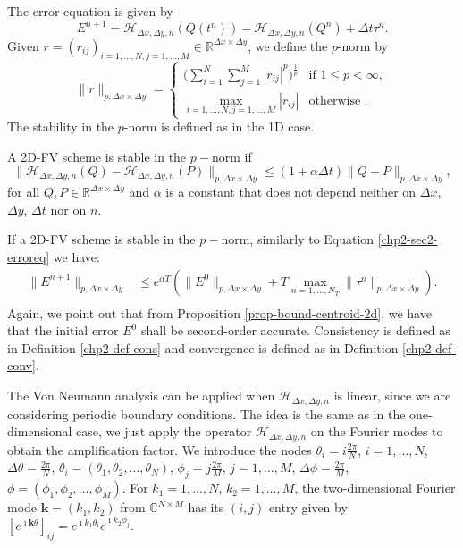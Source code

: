 The error equation is given by
\begin{equation}
	E^{n+1} = \mathcal{H}_{\Delta x ,\Delta y,n}(Q(t^n)) - \mathcal{H}_{\Delta x ,\Delta y,n}(Q^n) +  \Delta t \tau^n.
\end{equation}
Given $r = (r_{ij})_{i=1,\ldots,N,j=1,\ldots,M}\in \mathbb{R}^{\Delta x \times \Delta y}$, we define the $p$-norm by
\begin{equation}
	\label{chp3-pnorm}
	\|r\|_{p,\Delta x \times \Delta y}=
	\begin{cases}
		\bigg( \sum_{i=1}^{N} \sum_{j=1}^{M}|r_{ij}|^p \bigg)^{\frac{1}{p}} & \text{if } 1\leq p < \infty,\\
		\max_{i=1, \ldots, N,j=1,\ldots,M}{|r_{ij}|} & \text{otherwise }.
	\end{cases}
\end{equation}
The stability in the $p$-norm is defined as in the 1D case.
\begin{definition}
	A 2D-FV scheme is stable in the $p-$norm if 
	\begin{equation}
		\|\mathcal{H}_{\Delta x ,\Delta y,n}(Q) - \mathcal{H}_{\Delta x ,\Delta y,n}(P)\|_{p,\Delta x \times \Delta y} \leq (1+\alpha \Delta t)  \|Q-P\|_{p,\Delta x \times \Delta y},
	\end{equation}
	for all $Q, P \in \mathbb{R}^{\Delta x \times \Delta y}$ and $\alpha$ is a constant
	that does not depend neither on $\Delta x$, $\Delta y$, $\Delta t$ nor on $n$.
\end{definition}
If a 2D-FV scheme is stable in the $p-$norm, similarly to Equation \eqref{chp2-sec2-erroreq} we have:
\begin{align*}
		\|E^{n+1}\|_{p,\Delta x \times \Delta y} &\leq e^{\alpha T}(\|E^0\|_{p,\Delta x \times \Delta y} + T\max_{n=1, \ldots, N_T}\|\tau^n\|_{p,\Delta x \times \Delta y}).\\
\end{align*}
Again, we point out that from Proposition \ref{prop-bound-centroid-2d}, we have that the initial error $E^0$ shall be second-order accurate.
Consistency is defined as in Definition \ref{chp2-def-cons} and convergence is defined as in Definition \ref{chp2-def-conv}.

The Von Neumann analysis can be applied when $\mathcal{H}_{\Delta x ,\Delta y,n}$ is linear, since we are considering periodic boundary conditions.
The idea is the same as in the one-dimensional case, we just apply the operator $\mathcal{H}_{\Delta x ,\Delta y,n}$ on the Fourier modes to obtain
the amplification factor.
We introduce the nodes $\theta_i = i\frac{2\pi}{N}$, $i=1, \ldots, N$, $\Delta \theta = \frac{2\pi}{N}$,
$\theta_i = (\theta_1, \theta_2, \ldots, \theta_N)$, $\phi_j = j\frac{2\pi}{M}$, $j=1, \ldots, M$, $\Delta \phi = \frac{2\pi}{M}$,
$\phi = (\phi_1, \phi_2, \ldots, \phi_M)$.
For $k_1=1, \ldots, N$, $k_2=1, \ldots, M$, the two-dimensional Fourier mode $\boldsymbol{k} = (k_1,k_2)$ from $\mathbb{C}^{N\times M}$ 
has its $(i,j)$ entry given by $[e^{\imath \boldsymbol{k} \theta}]_{ij} = e^{\imath k_1 \theta_i}e^{\imath k_2 \phi_j}$. 


